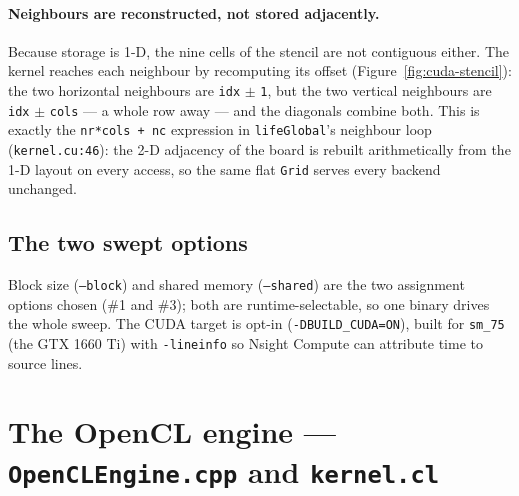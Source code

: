 \documentclass[
	english,
	letterpaper, oneside
]{article}
\begin{document}

\paragraph{Neighbours are reconstructed, not stored adjacently.} Because storage
is 1-D, the nine cells of the stencil are not contiguous either. The kernel
reaches each neighbour by recomputing its offset
(Figure~\ref{fig:cuda-stencil}): the two horizontal neighbours are \texttt{idx}
$\pm$ \texttt{1}, but the two vertical neighbours are \texttt{idx} $\pm$
\texttt{cols} --- a whole row away --- and the diagonals combine both. This is
exactly the \texttt{nr*cols + nc} expression in \texttt{lifeGlobal}'s neighbour
loop (\texttt{kernel.cu:46}): the 2-D adjacency of the board is rebuilt
arithmetically from the 1-D layout on every access, so the same flat
\texttt{Grid} serves every backend unchanged.


\subsection{The two swept options}

Block size (\texttt{--block}) and shared memory (\texttt{--shared}) are the two
assignment options chosen (\#1 and \#3); both are runtime-selectable, so one
binary drives the whole sweep. The CUDA target is opt-in
(\texttt{-DBUILD\_CUDA=ON}), built for \texttt{sm\_75} (the GTX 1660 Ti) with
\texttt{-lineinfo} so Nsight Compute can attribute time to source lines.

\section{The OpenCL engine --- \texttt{OpenCLEngine.cpp} and \texttt{kernel.cl}}
\label{sec:opencl}
\end{document}
